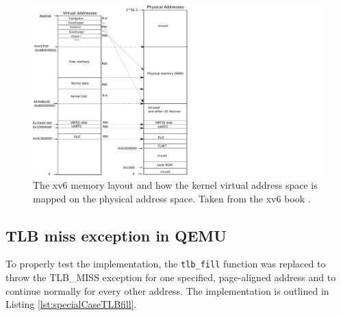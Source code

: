 \begin{figure}[t!]
    \centering
    \includegraphics[scale=.5]{figures/xv6_layout.pdf}
    \caption[xv6 memory layout]{The xv6 memory layout and how the kernel virtual address space is mapped on
        the physical address space. Taken from the xv6 book \cite{cox2011xv6}.}
    \label{impl:xv6layout}
\end{figure}


\subsection{TLB miss exception in QEMU}


To properly test the implementation, the \texttt{tlb\_fill} function was replaced to throw the
TLB\_MISS exception for
one specified, page-aligned address and to continue normally for every other address.
The implementation is outlined
in Listing \ref{lst:specialCaseTLBfill}.




